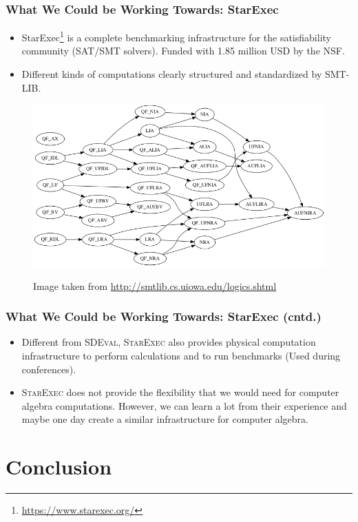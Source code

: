 \documentclass{beamer}
\begin{document}
\begin{frame}
\frametitle{What We Could be Working Towards: StarExec}
\begin{itemize}
\item StarExec\footnote{\url{https://www.starexec.org/}} is a complete
  benchmarking infrastructure for the satisfiability community
  (SAT/SMT solvers). Funded with 1.85 million USD by the NSF.
\item Different kinds of computations clearly structured and
  standardized by \textsc{SMT-LIB}.
\end{itemize}
\begin{figure}
\begin{center}
\includegraphics[width=.5\textwidth]{pics/logics.png}\\
\caption{Image taken from \url{http://smtlib.cs.uiowa.edu/logics.shtml}}
\end{center}
\end{figure}
\end{frame}

\begin{frame}
\frametitle{What We Could be Working Towards: StarExec (cntd.)}
\begin{itemize}
\item Different from \textsc{SDEval}, \textsc{StarExec} also provides
  physical computation infrastructure to perform calculations and to
  run benchmarks (Used during conferences).
\item \textsc{StarExec} does not provide the flexibility that we would
  need for computer algebra computations. However, we can learn a lot
  from their experience and maybe one day create a similar
  infrastructure for computer algebra.
\end{itemize}
\end{frame}

\section{Conclusion}
\frame
{
    \begin{center}
      {\Huge{\insertsection}}
    \end{center}
}
\end{document}
